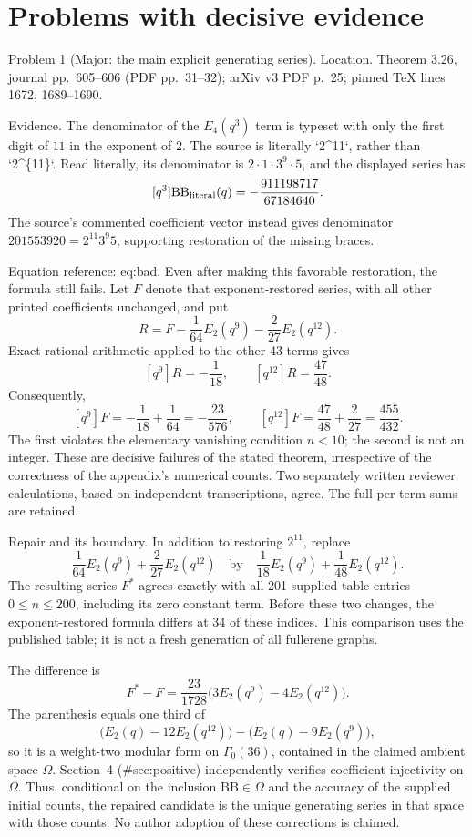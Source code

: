 \documentclass[10pt]{article}
\begin{document}
\section*{Problems with decisive evidence}
Problem 1 (Major: the main explicit generating series).  Location. Theorem 3.26, journal pp. 605–606 (PDF pp. 31–32); arXiv v3 PDF p. 25; pinned TeX lines 1672, 1689–1690.\par
Evidence. The denominator of the \(E_4(q^3)\) term is typeset with only the first digit of \(11\) in the exponent of \(2\). The source is literally `2\textasciicircum{}11`, rather than `2\textasciicircum{}\{11\}`. Read literally, its denominator is \(2\cdot1\cdot3^9\cdot5\), and the displayed series has \[[q^3]\mathrm{BB}_{\rm literal}(q)=-\frac{911198717}{67184640}.\] The source’s commented coefficient vector instead gives denominator \(201553920=2^{11}3^9 5\), supporting restoration of the missing braces.\par
Equation reference: eq:bad. Even after making this favorable restoration, the formula still fails. Let \(F\) denote that exponent-restored series, with all other printed coefficients unchanged, and put \[R=F-\frac1{64}E_2(q^9)-\frac2{27}E_2(q^{12}).\] Exact rational arithmetic applied to the other 43 terms gives \[[q^9]R=-\frac1{18},\qquad [q^{12}]R=\frac{47}{48}.\] Consequently, \[
 [q^9]F=-\frac1{18}+\frac1{64}=-\frac{23}{576},
 \qquad
 [q^{12}]F=\frac{47}{48}+\frac2{27}=\frac{455}{432}.\] The first violates the elementary vanishing condition \(n<10\); the second is not an integer. These are decisive failures of the stated theorem, irrespective of the correctness of the appendix’s numerical counts. Two separately written reviewer calculations, based on independent transcriptions, agree. The full per-term sums are retained.\par
Repair and its boundary. In addition to restoring \(2^{11}\), replace \[\frac1{64}E_2(q^9)+\frac2{27}E_2(q^{12})
 \quad\text{by}\quad
 \frac1{18}E_2(q^9)+\frac1{48}E_2(q^{12}).\] The resulting series \(F^\ast\) agrees exactly with all 201 supplied table entries \(0\le n\le200\), including its zero constant term. Before these two changes, the exponent-restored formula differs at 34 of these indices. This comparison uses the published table; it is not a fresh generation of all fullerene graphs.\par
The difference is \[F^\ast-F=\frac{23}{1728}\bigl(3E_2(q^9)-4E_2(q^{12})\bigr).\] The parenthesis equals one third of \[\bigl(E_2(q)-12E_2(q^{12})\bigr)
 -\bigl(E_2(q)-9E_2(q^9)\bigr),\] so it is a weight-two modular form on \(\Gamma_0(36)\), contained in the claimed ambient space \(\Omega\). Section 4 (\#sec:positive) independently verifies coefficient injectivity on \(\Omega\). Thus, conditional on the inclusion \(\mathrm{BB}\in\Omega\) and the accuracy of the supplied initial counts, the repaired candidate is the unique generating series in that space with those counts. No author adoption of these corrections is claimed.\par
\end{document}
